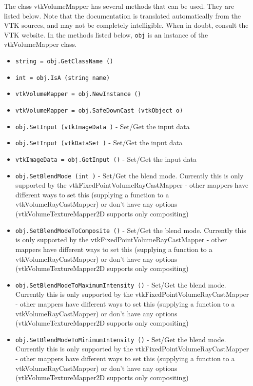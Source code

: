 The class vtkVolumeMapper has several methods that can be used.
  They are listed below.
Note that the documentation is translated automatically from the VTK sources,
and may not be completely intelligible.  When in doubt, consult the VTK website.
In the methods listed below, \verb|obj| is an instance of the vtkVolumeMapper class.
\begin{itemize}
\item  \verb|string = obj.GetClassName ()|

\item  \verb|int = obj.IsA (string name)|

\item  \verb|vtkVolumeMapper = obj.NewInstance ()|

\item  \verb|vtkVolumeMapper = obj.SafeDownCast (vtkObject o)|

\item  \verb|obj.SetInput (vtkImageData )| -  Set/Get the input data

\item  \verb|obj.SetInput (vtkDataSet )| -  Set/Get the input data

\item  \verb|vtkImageData = obj.GetInput ()| -  Set/Get the input data

\item  \verb|obj.SetBlendMode (int )| -  Set/Get the blend mode. Currently this is only supported
 by the vtkFixedPointVolumeRayCastMapper - other mappers
 have different ways to set this (supplying a function
 to a vtkVolumeRayCastMapper) or don't have any options
 (vtkVolumeTextureMapper2D supports only compositing)

\item  \verb|obj.SetBlendModeToComposite ()| -  Set/Get the blend mode. Currently this is only supported
 by the vtkFixedPointVolumeRayCastMapper - other mappers
 have different ways to set this (supplying a function
 to a vtkVolumeRayCastMapper) or don't have any options
 (vtkVolumeTextureMapper2D supports only compositing)

\item  \verb|obj.SetBlendModeToMaximumIntensity ()| -  Set/Get the blend mode. Currently this is only supported
 by the vtkFixedPointVolumeRayCastMapper - other mappers
 have different ways to set this (supplying a function
 to a vtkVolumeRayCastMapper) or don't have any options
 (vtkVolumeTextureMapper2D supports only compositing)

\item  \verb|obj.SetBlendModeToMinimumIntensity ()| -  Set/Get the blend mode. Currently this is only supported
 by the vtkFixedPointVolumeRayCastMapper - other mappers
 have different ways to set this (supplying a function
 to a vtkVolumeRayCastMapper) or don't have any options
 (vtkVolumeTextureMapper2D supports only compositing)


\end{itemize}
